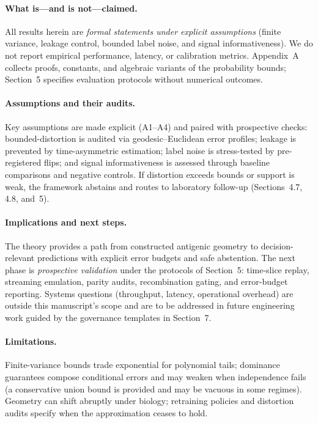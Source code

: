 \documentclass[11pt]{article}
\begin{document}
\paragraph{What is—and is not—claimed.}
All results herein are \emph{formal statements under explicit assumptions} (finite variance, leakage control, bounded label noise, and signal informativeness). We do not report empirical performance, latency, or calibration metrics. Appendix~A collects proofs, constants, and algebraic variants of the probability bounds; Section~5 specifies evaluation protocols without numerical outcomes.

\paragraph{Assumptions and their audits.}
Key assumptions are made explicit (A1–A4) and paired with prospective checks: bounded-distortion is audited via geodesic--Euclidean error profiles; leakage is prevented by time-asymmetric estimation; label noise is stress-tested by pre-registered flips; and signal informativeness is assessed through baseline comparisons and negative controls. If distortion exceeds bounds or support is weak, the framework abstains and routes to laboratory follow-up (Sections~4.7, 4.8, and~5).

\paragraph{Implications and next steps.}
The theory provides a path from constructed antigenic geometry to decision-relevant predictions with explicit error budgets and safe abstention. The next phase is \emph{prospective validation} under the protocols of Section~5: time-slice replay, streaming emulation, parity audits, recombination gating, and error-budget reporting. Systems questions (throughput, latency, operational overhead) are outside this manuscript’s scope and are to be addressed in future engineering work guided by the governance templates in Section~7.

\paragraph{Limitations.}
Finite-variance bounds trade exponential for polynomial tails; dominance guarantees compose conditional errors and may weaken when independence fails (a conservative union bound is provided and may be vacuous in some regimes). Geometry can shift abruptly under biology; retraining policies and distortion audits specify when the approximation ceases to hold.
\end{document}
